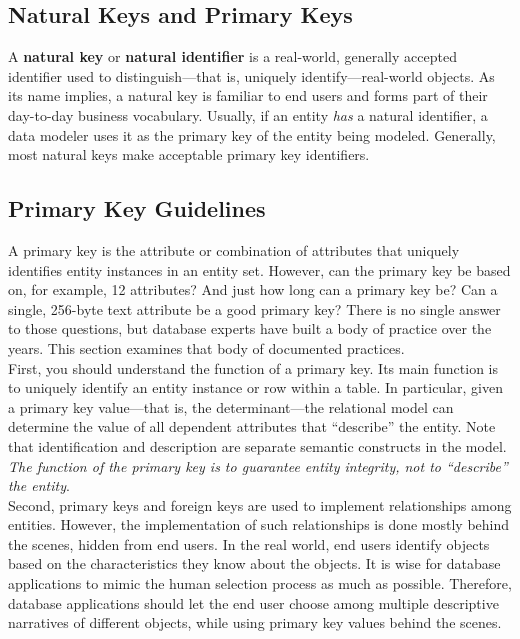 \documentclass[a4paper, 12pt, titlepage]{report}
\begin{document}
{\subsection{Natural Keys and Primary Keys}
A \textbf{natural key} or \textbf{natural identifier} is a real-world, generally accepted identifier used to distinguish—that is, uniquely identify—real-world objects. As its name implies, a natural key is familiar to end users and forms part of their day-to-day business vocabulary. Usually, if an entity \emph{has} a natural identifier, a data modeler uses it as the primary key of the entity being modeled. Generally, most natural keys make acceptable primary key identifiers.
\subsection{Primary Key Guidelines}
A primary key is the attribute or combination of attributes that uniquely identifies entity instances in an entity set. However, can the primary key be based on, for example, 12 attributes? And just how long can a primary key be? Can a single, 256-byte text attribute be a good primary key? There is no single answer to those questions, but database experts have built a body of practice over the years. This section examines that body of documented practices.\\
First, you should understand the function of a primary key. Its main function is to uniquely identify an entity instance or row within a table. In particular, given a primary key value—that is, the determinant—the relational model can determine the value of all dependent attributes that “describe” the entity. Note that identification and description are separate semantic constructs in the model. \emph{The function of the primary key is to guarantee entity integrity, not to “describe” the entity}.\\
Second, primary keys and foreign keys are used to implement relationships among entities. However, the implementation of such relationships is done mostly behind the scenes, hidden from end users. In the real world, end users identify objects based on the characteristics they know about the objects. It is wise for database applications to mimic the human selection process as much as possible. Therefore, database applications should let the end user choose among multiple descriptive narratives of different objects, while using primary key values behind the scenes.
\pagebreak
\begin{center}
\begin{longtable}{ p{5cm} p{9cm} }

\end{longtable}
\end{center}}
\end{document}
